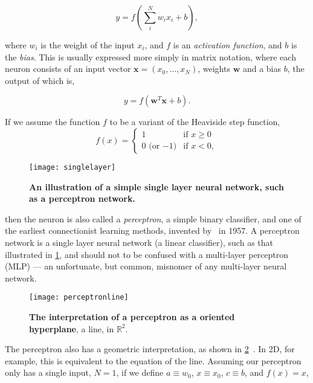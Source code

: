 \documentclass[thesis]{subfiles}
\begin{document}
\begin{equation}
	y = f\left(\sum_{i}^{N} w_i x_i + b\right),
\end{equation}

where $w_i$ is the weight of the input $x_i$, and $f$ is an \emph{activation function}, and $b$ is the \emph{bias}. This is usually expressed more simply in matrix notation, where each neuron consists of an input vector $\mathbf{x}=(x_0,\ldots,x_N)$, weights $\mathbf{w}$ and a bias $b$, the output of which is, %

\begin{equation}
    y = f\left(\mathbf{w}^T\mathbf{x} + b \right).
\end{equation}

If we assume the function $f$ to be a variant of the Heaviside step function,
\begin{equation}
    f(x) = 
\begin{cases}
1 & \text{if } x \geq 0\\
0 \textrm{ (or $-1$)} & \text{if } x < 0,
\end{cases}
\end{equation}

\begin{figure}[tbp]
\centering
\texttt{[image: singlelayer]}
\caption[A single layer neural network.]{\textbf{An illustration of a simple single layer neural network, such as a perceptron network.}}
\label{fig:singlelayer}
\end{figure}
then the neuron is also called a \emph{perceptron}, a simple binary classifier, and one of the earliest connectionist learning methods, invented by~\citet{rosenblatt1958perceptron} in 1957. A perceptron network is a single layer neural network (\ie{}a linear classifier), such as that illustrated in \cref{fig:singlelayer}, and should not to be confused with a multi-layer perceptron (MLP) --- an unfortunate, but common, misnomer of any multi-layer neural network.
\begin{figure}[tbp]
\centering
\texttt{[image: perceptronline]}
\caption[The interpretation of a perceptron as a hyperplane.]{\textbf{The interpretation of a perceptron as a oriented hyperplane}, \ie{}a line, in $\mathbb{R}^2$.}
\label{fig:hyperplane}
\end{figure}
The perceptron also has a geometric interpretation, as shown in \cref{fig:hyperplane}~\citet{Bishop1995}. In 2D, for example, this is equivalent to the equation of the line. Assuming our perceptron only has a single input, \ie{}$N=1$, if we define $a\equiv w_0$, $x \equiv x_0$, $c \equiv b$, and $f(x) = x$,
\end{document}
